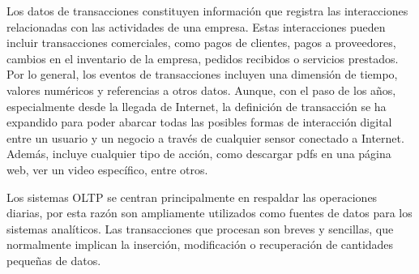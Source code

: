 Los datos de transacciones constituyen información que registra las interacciones relacionadas con las actividades de una empresa. Estas 
interacciones pueden incluir transacciones comerciales, como pagos de clientes, pagos a proveedores, cambios en el inventario de la empresa, 
pedidos recibidos o servicios prestados. Por lo general, los eventos de transacciones incluyen una dimensión de tiempo, valores numéricos y 
referencias a otros datos\cite{oltpAzure}. Aunque, con el paso de los años, especialmente desde la llegada de 
Internet, la definición de transacción 
se ha expandido para poder abarcar todas las posibles formas de interacción digital entre un usuario y un negocio a través 
de cualquier sensor conectado a Internet. Además, incluye cualquier tipo de acción, como descargar pdfs en una 
página web, ver un video específico, entre otros\cite{oltpOracle}.

Los sistemas OLTP se centran principalmente en respaldar las operaciones diarias, por esta raz\'on son ampliamente 
utilizados como fuentes de datos para los sistemas analíticos. Las transacciones que procesan son breves y 
sencillas, que normalmente implican la inserción, modificación o recuperación de cantidades pequeñas de datos.
